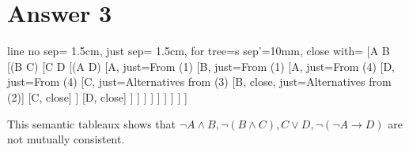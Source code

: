 \documentclass[12pt]{article}
\begin{document}

\section*{Answer 3}


\begin{tableau}
    {
        line no sep= 1.5cm,
        just sep= 1.5cm, %
        for tree={s sep'=10mm},
        close with=
    }
    [\neg A \land B
        [\neg (B \land C)
            [C \lor D
                [\neg (\neg A \rightarrow D)
                    [\neg A, just={From (1)}
                        [B, just={From (1)}
                            [\neg A, just={From (4)}
                                [\neg D, just={From (4)}
                                    [C, just={Alternatives from (3)}
                                        [\neg B, close, just={Alternatives from (2)}]
                                        [\neg C, close]
                                    ]
                                    [D, close]
                                ]
                            ]
                        ]
                    ]
                ]
            ]
        ]
    ]
]
\end{tableau}

This semantic tableaux shows that $ \neg A \wedge B, \neg (B \wedge C), C \vee D, \neg (\neg A \rightarrow D) $ are not mutually consistent.
\end{document}
